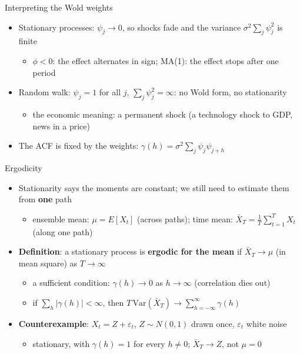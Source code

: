\begin{frame}{Interpreting the Wold weights}
\itemsize{\small}
\begin{itemize}
    \item Stationary processes: $\psi_j \to 0$, so shocks fade and the variance $\sigma^2\sum_j\psi_j^2$ is finite
    \begin{itemize}
        \item $\phi < 0$: the effect alternates in sign; MA(1): the effect stops after one period
    \end{itemize}
    \item Random walk: $\psi_j = 1$ for all $j$, $\sum_j\psi_j^2 = \infty$: no Wold form, no stationarity
    \begin{itemize}
        \item the economic meaning: a permanent shock (a technology shock to GDP, news in a price)
    \end{itemize}
    \item The ACF is fixed by the weights: $\gamma(h) = \sigma^2\sum_j\psi_j\psi_{j+h}$
\end{itemize}
\end{frame}

\begin{frame}{Ergodicity}
\itemsize{\small}
\begin{itemize}
    \item Stationarity says the moments are constant; we still need to estimate them from \textbf{one} path
    \begin{itemize}
        \item ensemble mean: $\mu = E[X_t]$ (across paths); time mean: $\bar X_T = \frac1T\sum_{t=1}^{T}X_t$ (along one path)
    \end{itemize}
    \item \textbf{Definition}: a stationary process is \textbf{ergodic for the mean} if $\bar X_T \to \mu$ (in mean square) as $T \to \infty$
    \begin{itemize}
        \item a sufficient condition: $\gamma(h) \to 0$ as $h \to \infty$ (correlation dies out)
        \item if $\sum_h|\gamma(h)| < \infty$, then $T\,\mathrm{Var}(\bar X_T) \to \sum_{h=-\infty}^{\infty}\gamma(h)$
    \end{itemize}
    \item \textbf{Counterexample}: $X_t = Z + \varepsilon_t$, $Z \sim N(0, 1)$ drawn once, $\varepsilon_t$ white noise
    \begin{itemize}
        \item stationary, with $\gamma(h) = 1$ for every $h \ne 0$; $\bar X_T \to Z$, not $\mu = 0$
    \end{itemize}
\end{itemize}
\end{frame}

